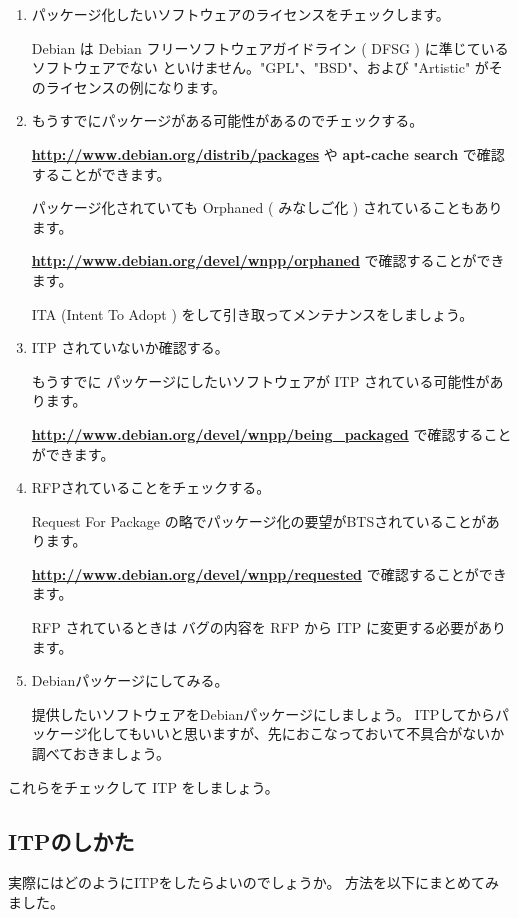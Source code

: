 \documentclass[mingoth]{jsarticle}
\begin{document}
  	\begin{enumerate}
  	\item パッケージ化したいソフトウェアのライセンスをチェックします。
	
        Debian は Debian フリーソフトウェアガイドライン ( DFSG ) に準じているソフトウェアでない
        といけません。"GPL"、"BSD"、および "Artistic" がそのライセンスの例になります。

    \item もうすでにパッケージがある可能性があるのでチェックする。
	
        {\bf \url{http://www.debian.org/distrib/packages} } や {\bf apt-cache search }で確認することができます。
		
        パッケージ化されていても Orphaned ( みなしご化 ) されていることもあります。
		
        {\bf \url{http://www.debian.org/devel/wnpp/orphaned} }で確認することができます。

        ITA (Intent To Adopt ) をして引き取ってメンテナンスをしましょう。

    \item ITP されていないか確認する。
	
        もうすでに パッケージにしたいソフトウェアが ITP されている可能性があります。

        {\bf \url{http://www.debian.org/devel/wnpp/being_packaged} }で確認することができます。

    \item RFPされていることをチェックする。
	
        Request For Package の略でパッケージ化の要望がBTSされていることがあります。

        {\bf \url{http://www.debian.org/devel/wnpp/requested} }で確認することができます。
		
        RFP されているときは バグの内容を RFP から ITP に変更する必要があります。

    \item Debianパッケージにしてみる。
	
        提供したいソフトウェアをDebianパッケージにしましょう。
        ITPしてからパッケージ化してもいいと思いますが、先におこなっておいて不具合がないか調べておきましょう。
		
	\end{enumerate}
    これらをチェックして ITP をしましょう。

\subsection{ITPのしかた}
    実際にはどのようにITPをしたらよいのでしょうか。
    方法を以下にまとめてみました。
\end{document}

